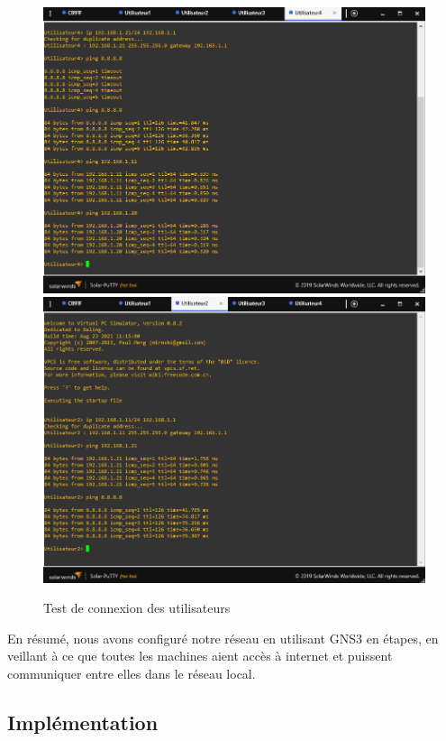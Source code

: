 \begin{figure}[H]
 \centering
    \includegraphics[width=15.5cm]{Images/BRades-Topologie8.png}
    \includegraphics[width=15.5cm]{Images/BRades-Topologie9.png}
    \caption{Test de connexion des utilisateurs}
    \label{Chap2.2.7}
\end{figure}


En résumé, nous avons configuré notre réseau en utilisant GNS3 en étapes, en veillant à ce que toutes les machines aient accès à internet et puissent communiquer entre elles dans le réseau local.


  
\subsection{Implémentation}


